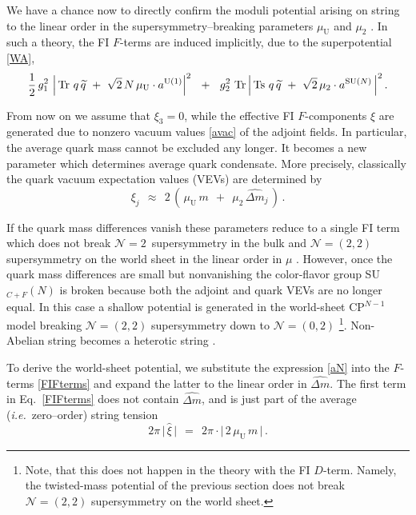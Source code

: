 \documentclass[12pt]{article}
\def\beq{\begin{equation}}
\def\eeq{\end{equation}}
\newcommand{\ntwon}{${\mathcal N}=2$}
\newcommand{\ntwot}{${\mathcal N}= \left(2,2\right) $ }
\newcommand{\ntwoo}{${\mathcal N}= \left(0,2\right) $ }
\newcommand{\wt}{\widetilde}
\newcommand{\aU}{a^{\rm U(1)}}
\newcommand{\aN}{a^\text{SU($N$)}}
\newcommand{\muU}{\mu_\text{U}}
\newcommand{\cpn}{CP$^{N-1}$\,}
\newcommand{\qt}{\wt{q}}
\newcommand{\Tr}{\text{Tr}}
\newcommand{\Ts}{\text{Ts}}
\newcommand{\dm}{\hat{{\scriptstyle \Delta} m}}
\newcommand{\ie}{{\it i.e.}~}
\begin{document}
	We have a chance now to directly confirm the moduli potential arising on string to the linear order
	in the supersymmetry--breaking parameters $ \muU $ and $ \mu_2 $ \cite{Shifman:2010kr}.
	In such a theory, the FI $ F $-terms are induced implicitly, due to the superpotential \eqref{WA},
\beq
\label{FIFterms}
	\frac{1}{2}\,g_1^2~ \Big|\, \Tr~ q\, \qt ~+~ \sqrt{2}\, N\, \muU \cdot \aU \Big|^2
	~~+~~
	g_2^2~ \Tr\, \Big|\, \Ts~ q\, \qt ~+~ \sqrt{2}\, \mu_2 \cdot \aN \,\Big|^2\,.
\eeq

	From now on we assume that $\xi_3=0$, while the effective FI $F$-components  $\xi$ are generated due to nonzero
	vacuum values \eqref{avac} of the adjoint fields. 
	In particular, the average quark mass cannot be excluded any longer. 
	It becomes a new parameter which determines average quark condensate. More precisely, classically 
	the quark vacuum expectation values (VEVs) are determined by
\beq
\label{xij}
	\xi_j    ~~\approx~~    2\, \left(\, \muU\,m  ~~+~~  \mu_2\,\dm{}_j \,\right)\,.
\eeq

	If the quark mass differences vanish these parameters reduce to a single FI term 
	which does not break \ntwon\, supersymmetry in the bulk and 
	\ntwot supersymmetry on the world sheet in the linear order in $\mu$ \cite{HSZ,VY}. 
	However, once the quark mass differences are small but nonvanishing the color-flavor group SU$_{C+F}(N)$ is broken 
	because both  the adjoint and quark VEVs are no longer equal. 
	In this case a shallow potential is generated in the world-sheet \cpn model
	breaking \ntwot supersymmetry down to \ntwoo \cite{Shifman:2010kr}\footnote{Note, that this does not happen 
	in the theory with the FI $D$-term. 
	Namely, the twisted-mass potential of the previous section 
	does not break \ntwot supersymmetry on the world sheet.}. 
	Non-Abelian string becomes a heterotic string \cite{Edalati,SY1}.

	To derive the world-sheet potential, we substitute the expression \eqref{aN} into the $ F $-terms
	\eqref{FIFterms} and expand the latter to the linear order in $ \dm $.
	The first term in Eq.~\eqref{FIFterms} does not contain $ \dm $, 
	and is just part of the average (\ie zero--order) string tension
\beq
\label{avtension}
	2 \pi\, \big|\, \hat{\xi} \,\big|    ~~=~~    2 \pi \cdot \Big|\, 2\, \muU\, m \,\Big| \,.
\eeq
	
\end{document}
